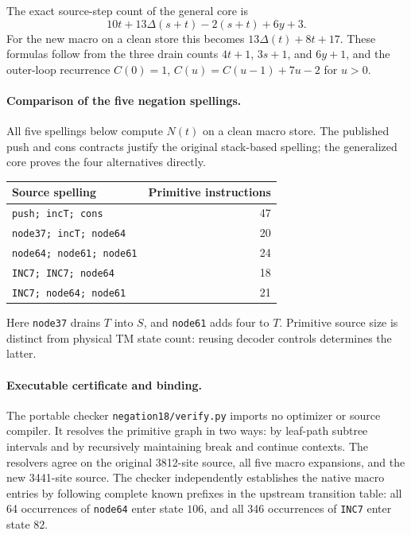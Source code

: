 The exact source-step count of the general core is
\[
 10t+13\Delta(s+t)-2(s+t)+6y+3.
\]
For the new macro on a clean store this becomes
$13\Delta(t)+8t+17$. These formulas follow from the three drain counts
$4t+1$, $3s+1$, and $6y+1$, and the outer-loop recurrence
$C(0)=1$, $C(u)=C(u-1)+7u-2$ for $u>0$.

\paragraph{Comparison of the five negation spellings.}
All five spellings below compute $N(t)$ on a clean macro store. The
published push and cons contracts justify the original stack-based
spelling; the generalized core proves the four alternatives directly.
\begin{center}
\begin{tabular}{lr}
\hline
Source spelling & Primitive instructions\\
\hline
\texttt{push; incT; cons} & 47\\
\texttt{node37; incT; node64} & 20\\
\texttt{node64; node61; node61} & 24\\
\texttt{INC7; INC7; node64} & 18\\
\texttt{INC7; node64; node61} & 21\\
\hline
\end{tabular}
\end{center}
Here \texttt{node37} drains $T$ into $S$, and \texttt{node61} adds four
to $T$. Primitive source size is distinct from physical TM state count:
reusing decoder controls determines the latter.

\paragraph{Executable certificate and binding.}
The portable checker \texttt{negation18/verify.py} imports no optimizer
or source compiler. It resolves the primitive graph in two ways: by
leaf-path subtree intervals and by recursively maintaining break and
continue contexts. The resolvers agree on the original 3812-site
source, all five macro expansions, and the new 3441-site source.
The checker independently establishes the native macro entries by
following complete known prefixes in the upstream transition table:
all 64 occurrences of \texttt{node64} enter state $106$, and all 346
occurrences of \texttt{INC7} enter state $82$.

